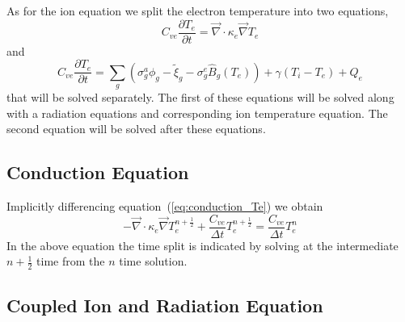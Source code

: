 \documentclass{article}
\newcommand{\partl}[2]{\ensuremath{\frac{\partial{#1}}{\partial{#2}}}}\newcommand{\del}{\ensuremath{\vec{\nabla}}}
\newcommand{\Bg}{\ensuremath{\hat{B}_{g}}}
\begin{document}
As for the ion equation we split the electron temperature into two
equations,
\begin{equation}
        C_{ve} \partl{T_{e}}{t} = 
                \del \cdot \kappa_{e} \del T_{e}
\label{eq:conduction_Te}
\end{equation}
and
\begin{equation}
        C_{ve} \partl{T_{e}}{t} = 
                \sum_{g} \left(
                        \sigma_{g}^{a} \phi_{g} - \tilde{\xi}_{g}
                        - \sigma_{g}^{e} \Bg(T_{e}) \right)
                        + \gamma (T_{i} - T_{e}) + Q_{e}
\label{eq:couple_Te}
\end{equation}
that will be solved separately.
The first of these equations will be solved along with a radiation
equations and corresponding
ion temperature equation.
The second equation will be solved after these equations.

\subsection{Conduction Equation}

Implicitly differencing equation~(\ref{eq:conduction_Te})
we obtain
\begin{equation}
  \boxed{
     - \del \cdot \kappa_{e} \del T_{e}^{n+\frac{1}{2}}
     + \frac{C_{ve}}{\Delta t} T_{e}^{n+\frac{1}{2}}
           = \frac{C_{ve}}{\Delta t} T_{e}^{n}
   }
\label{eq:conduction_Te_tdiff}  
\end{equation}
In the above equation the time split is indicated by solving at the
intermediate $n+\frac{1}{2}$ time from the $n$ time solution.

\subsection{Coupled Ion and Radiation Equation}
\end{document}
